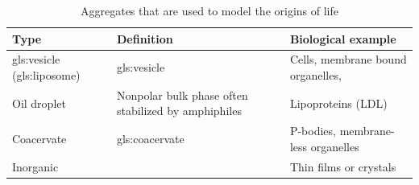 \documentclass[]{article}
\begin{document}
\begin{table}[H]
	\caption{Aggregates that are used to model the origins of life}\label{table:aggregates}
	\begin{tabular}{|l|p{4cm}|p{3cm}|} \hline
		Type & Definition &Biological example\\ \hline
		\Gls{gls:vesicle} (\gls{gls:liposome})& \glsdesc{gls:vesicle}& Cells, membrane bound organelles,\\ \hline
		Oil droplet&
		Nonpolar bulk phase often stabilized by
		amphiphiles&
		Lipoproteins (LDL)\\ \hline
		Coacervate&
		\glsdesc{gls:coacervate}&
		P-bodies, membrane-less organelles\\ \hline
		Inorganic&&Thin films or crystals\\ \hline
	\end{tabular}
\end{table}
\end{document}
